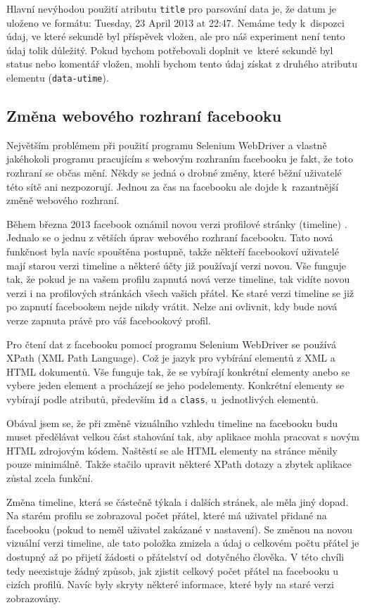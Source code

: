 \documentclass[thesis=M,czech]{FITthesis}[2013/05/10]
\begin{document}
Hlavní nevýhodou použití atributu \verb|title| pro parsování data je, že datum je uloženo ve formátu: Tuesday, 23 April 2013 at 22:47. Nemáme tedy k~dispozci údaj, ve které sekundě byl příspěvek vložen, ale pro náš experiment není tento údaj tolik důležitý. Pokud bychom potřebovali doplnit ve~které sekundě byl status nebo komentář vložen, mohli bychom tento údaj získat z druhého atributu elementu (\verb|data-utime|). 

\subsection{Změna webového rozhraní facebooku}

Největším problémem při použití programu Selenium WebDriver a vlastně jakéhokoli programu pracujícím s webovým rozhraním facebooku je fakt, že toto rozhraní se občas mění. Někdy se jedná o drobné změny, které běžní uživatelé této sítě ani nezpozorují. Jednou za čas na facebooku ale dojde k~razantnější změně webového rozhraní.

Během března 2013 facebook oznámil novou verzi profilové stránky (timeline) \cite{web:fbTimelineImprovements}. Jednalo se o jednu z větších úprav webového rozhraní facebooku. Tato nová funkčnost byla navíc spouštěna postupně, takže někteří facebookoví uživatelé mají starou verzi timeline a některé účty již používají verzi novou. Vše funguje tak, že pokud je na vašem profilu zapnutá nová verze timeline, tak vidíte novou verzi i na profilových stránkách všech vašich přátel. Ke staré verzi timeline se již po zapnutí facebookem nejde nikdy vrátit. Nelze ani ovlivnit, kdy bude nová verze zapnuta právě pro váš facebookový profil.

Pro čtení dat z facebooku pomocí programu Selenium WebDriver se používá XPath (XML Path Language). Což je jazyk pro vybírání elementů z XML a HTML dokumentů. Vše funguje tak, že se vybírají konkrétní elementy anebo se vybere jeden element a procházejí se jeho podelementy. Konkrétní elementy se vybírají podle atributů, především \verb|id| a \verb|class|, u~jednotlivých elementů.

Obával jsem se, že při změně vizuálního vzhledu timeline na facebooku budu muset předělávat velkou část stahování tak, aby aplikace mohla pracovat s novým HTML zdrojovým kódem. Naštěstí se ale HTML elementy na stránce měnily pouze minimálně. Takže stačilo upravit některé XPath dotazy a zbytek aplikace zůstal zcela funkční.

Změna timeline, která se částečně týkala i dalších stránek, ale měla jiný dopad. Na starém profilu se zobrazoval počet přátel, které má uživatel přidané na facebooku (pokud to neměl uživatel zakázané v nastavení). Se změnou na novou vizuální verzi timeline, ale tato položka zmizela a údaj o celkovém počtu přátel je dostupný až po přijetí žádosti o přátelství od~dotyčného člověka. V této chvíli tedy neexistuje žádný způsob, jak zjistit celkový počet přátel na facebooku u cizích profilů. Navíc byly skryty některé informace, které byly na staré verzi zobrazovány.
\end{document}
